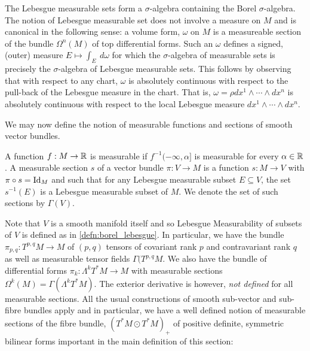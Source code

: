 \documentclass[a4paper, 12pt]{amsart}
\begin{document}
\begin{rem}
The Lebesgue measurable sets form a \(\sigma\)-algebra containing the Borel \(\sigma\)-algebra. The notion of Lebesgue measurable set does not involve a measure on \(M\) and is canonical in the following sense: a volume form, \(\omega\) on \(M\) is a measureable section of the bundle \(\Omega^n(M)\) of top differential forms. Such an \(\omega\) defines a signed, (outer) measure \(E \mapsto \int_E\ d\omega\) for which the \(\sigma\)-algebra of measurable sets is precisely the \(\sigma\)-algebra of Lebesgue measurable sets. This follows by observing that with respect to any chart, \(\omega\) is absolutely continuous with respect to the pull-back of the Lebesgue measure in the chart. That is, \(\omega = \rho dx^1 \wedge \cdots \wedge dx^n\) is absolutely continuous with respect to the local Lebesgue measure \(dx^1 \wedge \cdots \wedge dx^n\).
\end{rem}

We may now define the notion of measurable functions and sections of smooth vector bundles.

\begin{defn}
A function $f: M \to \mathbb{R}$ is measurable if $f^{-1}(-\infty, \alpha]$ is measurable for every $\alpha  \in \mathbb{R}$. A measurable section \(s\) of a vector bundle \(\pi : V \to M\) is a function \(s: M \to V\) with \(\pi \circ s = \operatorname{Id}_M\) and such that for any Lebesgue measurable subset \(E \subseteq V\), the set \(s^{-1}(E)\) is a Lebesgue measurable subset of \(M\).  We denote the set of such sections by $\Gamma(V)$.
\end{defn}

Note that \(V\) is a smooth manifold itself and so Lebesgue Measurability of subsets of \(V\) is defined as in \ref{defn:borel_lebesgue}. In particular, we have the bundle $\pi_{p,q} : T^{p,q}M \to M$ of $(p,q)$ tensors of covariant rank $p$ and contravariant rank $q$ as well as measurable tensor fields \(\Gamma(T^{p,q}M\). We also have the bundle of differential forms \(\pi_k : \Lambda^k T^{\ast} M \to M\) with measurable sections \(\Omega^k(M) = \Gamma(\Lambda^k T^{\ast} M)\). The exterior derivative is however, \emph{not defined} for all measurable sections. All the usual constructions of smooth sub-vector and sub-fibre bundles apply and in particular, we have a well defined notion of measurable sections of the fibre bundle, \((T^{\ast} M \odot T^{\ast} M)_+\) of positive definite, symmetric bilinear forms important in the main definition of this section:
\end{document}
